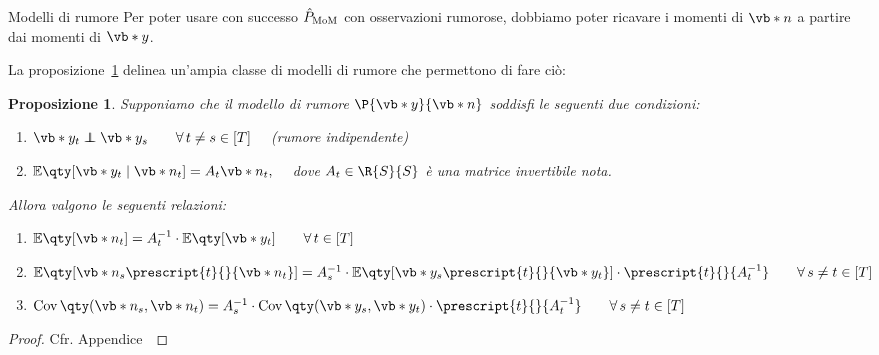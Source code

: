 \documentclass[10pt,xcolor={table,dvipsnames}]{beamer} 		%
\theoremstyle{plain}					%
\newtheorem{proposizione}{Proposizione}%
\theoremstyle{definition}
\theoremstyle{remark}
\newcommand{\transpose}[1]{\prescript{t}{}{#1}}
\newcommand{\Cov}[1]{\operatorname{Cov}\qty(#1)}
\newcommand\independent{\protect\mathpalette{\protect\independenT}{\perp}}
\def\independenT#1#2{\mathrel{\rlap{$#1#2$}\mkern2mu{#1#2}}}
\begin{document}
	\begin{frame}
		{\hypertarget{frame:prop_noise_model}{Modelli di rumore}}
		Per poter usare con successo $\hat{P}_{\textup{MoM}}$ con osservazioni rumorose,
		dobbiamo poter ricavare i momenti di $\vb*{n}$ a partire dai momenti di $\vb*{y}$.

		
		La proposizione~\ref{prop:noise_model} delinea un'ampia classe di modelli 
		di rumore che permettono di fare ciò:
		\begin{proposizione}\label{prop:noise_model}
			Supponiamo che il modello di rumore $\P{\vb*{y}}{\vb*{n}}$ soddisfi le seguenti
			due condizioni:
			\begin{enumerate}
				\item $\vb*{y}_t\independent\vb*{y}_s\qquad\forall\,t\ne s\in[T]\quad$ {\smaller (rumore indipendente)}
				\item $\mathbb{E}\qty[\vb*{y}_t\mid\vb*{n}_t]=A_t\vb*{n}_t,\quad$ dove $A_t\in\R{S}{S}$ è una 
				matrice \emph{invertibile} nota.
			\end{enumerate}
			Allora valgono le seguenti relazioni:
			\begin{enumerate}
				\item $\mathbb{E}\qty[\vb*{n}_t]=A_t^{-1}\cdot\mathbb{E}\qty[\vb*{y}_t]\qquad\forall\,t\in[T]$
				\item $\mathbb{E}\qty[\vb*{n}_s\transpose{\vb*{n}_t}]=A_s^{-1}\cdot\mathbb{E}\qty[\vb*{y}_s\transpose{\vb*{y}_t}]\cdot\transpose{A_t^{-1}}\qquad\forall\,s\ne t\in[T]$
				\item $\Cov{\vb*{n}_s,\vb*{n}_t}=A_s^{-1}\cdot\Cov{\vb*{y}_s,\vb*{y}_t}\cdot\transpose{A_t^{-1}}\qquad\forall\,s\ne t\in[T]$
			\end{enumerate}
		\end{proposizione}
		\begin{proof}
			Cfr. Appendice~\hyperlink{frame:dim_prop_noise_model:appendice}{\faHandPointRight}
		\end{proof}
	\end{frame}
\end{document}

